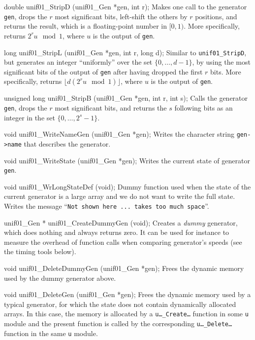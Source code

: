 
\code


double unif01_StripD (unif01_Gen *gen, int r);
\endcode
\tab Makes one call to the generator {\tt gen}, drops the $r$ most
  significant bits, left-shift the others by $r$ positions, and
  returns the result, which is a floating-point number in $[0,1)$.
 More specifically, returns $2^r u \mod 1$,
 where $u$ is the output of {\tt gen}.
 \endtab
\code


long unif01_StripL (unif01_Gen *gen, int r, long d);
\endcode
\tab
 Similar to {\tt unif01\_StripD}, but generates an integer ``uniformly'' over
 the set $\{0,\dots,d-1\}$, by using the most significant bits of the
 output of {\tt gen} after having dropped the first $r$ bits.
 More specifically, returns $\lfloor d (2^r u \mod 1)\rfloor$,
 where $u$ is the output of {\tt gen}.
\endtab
\code


unsigned long unif01_StripB (unif01_Gen *gen, int r, int s);
\endcode
\tab
 Calls the generator {\tt gen}, drops the $r$ most significant bits,
 and returns the $s$ following bits as an integer in
 the set $\{0,\dots,2^s-1\}$.
\endtab
\code


void unif01_WriteNameGen (unif01_Gen *gen);
\endcode
 \tab  Writes the character string {\tt gen->name} that describes the
  generator.
 \endtab
\code


void unif01_WriteState (unif01_Gen *gen);
\endcode
 \tab  Writes the current state of generator  {\tt gen}.
 \endtab
\code


void unif01_WrLongStateDef (void);
\endcode
 \tab Dummy function used when the state of the current
   generator is a large array and we do not want to write the full state.
   Writes the message ``{\tt   Not shown here ... takes too much space}''.
 \endtab
\code


unif01_Gen * unif01_CreateDummyGen (void);
\endcode
\tab  Creates a {\em dummy\/} generator, which does nothing and always
%
  returns zero. It can be used for instance to measure the overhead of
  function calls when comparing generator's speeds
  (see the timing tools below).
\endtab
\code


void unif01_DeleteDummyGen (unif01_Gen *gen);
\endcode
\tab  Frees the dynamic memory used by the dummy generator above.
\endtab
\ifdetailed
\code


void unif01_DeleteGen (unif01_Gen *gen);
\endcode
\tab  Frees the dynamic memory used by a typical generator, for which
  the state does not contain dynamically allocated arrays.
  In this case, the memory
  is allocated by a {\tt u\ldots\_Create\ldots} function in some
  {\tt u} module and the present function is called by the corresponding
  {\tt u\ldots\_Delete\ldots} function in the same {\tt u} module.
\endtab
\fi



